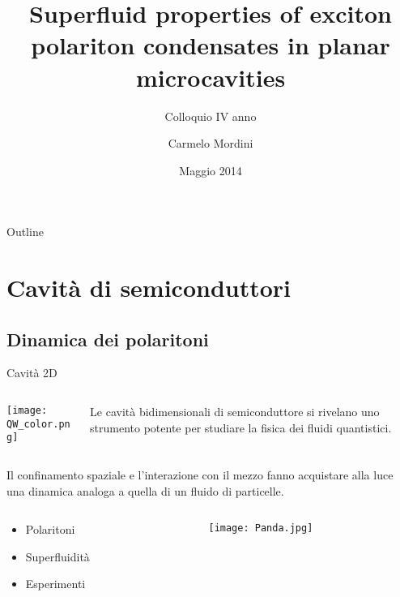 \documentclass[10pt]{beamer}
\title{Superfluid properties of exciton polariton condensates in planar microcavities}
\subtitle{Colloquio IV anno}
\author[Carmelo Mordini]{Carmelo Mordini\\ \vspace{.7cm}{\tiny Supervisors\\ \vspace{-.2cm}I. Carusotto ~ R. Fazio}}
\institute[SNS] 
{
  Scuola Normale Superiore\\
  }
\date{Maggio 2014}
\begin{document}
\begin{frame}
  \titlepage
\end{frame}

\begin{frame}{Outline}
  \tableofcontents
\end{frame}

\section{Cavità di semiconduttori}

\subsection{Dinamica dei polaritoni}

 \begin{frame}{Cavità 2D}
 \small

\begin{minipage}{\textwidth}
  \begin{columns}
  
  \begin{column}{.6\textwidth}
    \texttt{[image: QW\_color.png]}
  \end{column}

  \begin{column}{.4\textwidth}
    Le cavità bidimensionali di semiconduttore si rivelano uno strumento potente per studiare la fisica dei fluidi quantistici.
    \end{column}
  \end{columns}
  \end{minipage}
  
  Il confinamento spaziale e l'interazione con il mezzo fanno acquistare alla luce una dinamica analoga a quella di un fluido di particelle.
  
  \begin{minipage}{\textwidth}
  \begin{columns}
  
  \begin{column}{.5\textwidth}
    \begin{itemize}
     \item Polaritoni
     \item Superfluidità
     \item Esperimenti
    \end{itemize}

  \end{column}

  \begin{column}{.5\textwidth}
  \begin{figure}
    \texttt{[image: Panda.jpg]}
  \end{figure}
    \end{column}
  \end{columns}
  \end{minipage}
  
  
 \end{frame}
\end{document}

